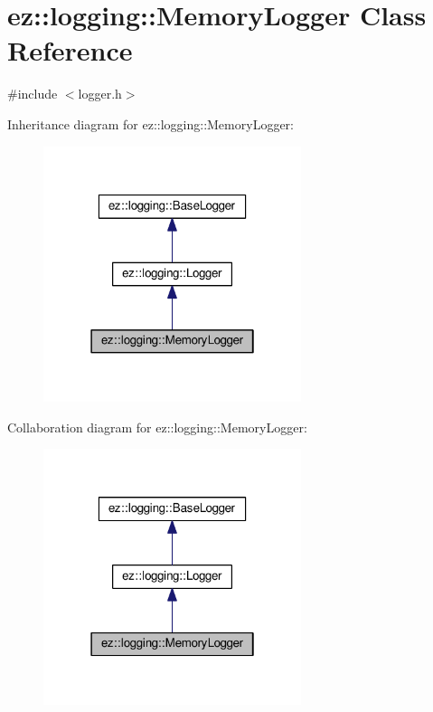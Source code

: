 \hypertarget{classez_1_1logging_1_1MemoryLogger}{}\section{ez\+:\+:logging\+:\+:Memory\+Logger Class Reference}
\label{classez_1_1logging_1_1MemoryLogger}


{\ttfamily \#include $<$logger.\+h$>$}



Inheritance diagram for ez\+:\+:logging\+:\+:Memory\+Logger\+:
\nopagebreak
\begin{figure}[H]
\begin{center}
\leavevmode
\includegraphics[width=214pt]{classez_1_1logging_1_1MemoryLogger__inherit__graph}
\end{center}
\end{figure}


Collaboration diagram for ez\+:\+:logging\+:\+:Memory\+Logger\+:
\nopagebreak
\begin{figure}[H]
\begin{center}
\leavevmode
\includegraphics[width=214pt]{classez_1_1logging_1_1MemoryLogger__coll__graph}
\end{center}
\end{figure}
